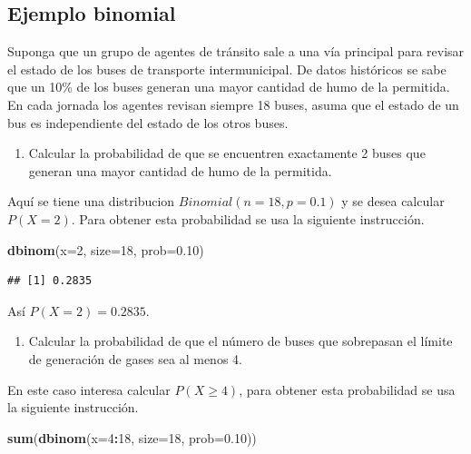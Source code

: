\documentclass[10pt,]{krantz}
\makeatletter
\newenvironment{Shaded}{\begin{snugshade}}{\end{snugshade}}
\newcommand{\KeywordTok}[1]{\textcolor[rgb]{0.13,0.29,0.53}{\textbf{#1}}}
\newcommand{\DataTypeTok}[1]{\textcolor[rgb]{0.13,0.29,0.53}{#1}}
\newcommand{\DecValTok}[1]{\textcolor[rgb]{0.00,0.00,0.81}{#1}}
\newcommand{\FloatTok}[1]{\textcolor[rgb]{0.00,0.00,0.81}{#1}}
\newcommand{\OperatorTok}[1]{\textcolor[rgb]{0.81,0.36,0.00}{\textbf{#1}}}
\newcommand{\NormalTok}[1]{#1}
\providecommand{\tightlist}{%
  \setlength{\itemsep}{0pt}\setlength{\parskip}{0pt}}
\newenvironment{kframe}{%
\medskip{}
\setlength{\fboxsep}{.8em}
 \def\at@end@of@kframe{}%
 \ifinner\ifhmode%
  \def\at@end@of@kframe{\end{minipage}}%
  \begin{minipage}{\columnwidth}%
 \fi\fi%
 \def\FrameCommand##1{\hskip\@totalleftmargin \hskip-\fboxsep
 \colorbox{shadecolor}{##1}\hskip-\fboxsep
     \hskip-\linewidth \hskip-\@totalleftmargin \hskip\columnwidth}%
 \MakeFramed {\advance\hsize-\width
   \@totalleftmargin\z@ \linewidth\hsize
   \@setminipage}}%
 {\par\unskip\endMakeFramed%
 \at@end@of@kframe}
\renewenvironment{Shaded}{\begin{kframe}}{\end{kframe}}
\makeatother
\begin{document}
\subsection*{Ejemplo binomial}\label{ejemplo-binomial}


Suponga que un grupo de agentes de tránsito sale a una vía principal
para revisar el estado de los buses de transporte intermunicipal. De
datos históricos se sabe que un 10\% de los buses generan una mayor
cantidad de humo de la permitida. En cada jornada los agentes revisan
siempre 18 buses, asuma que el estado de un bus es independiente del
estado de los otros buses.

\begin{enumerate}
\def\labelenumi{\arabic{enumi})}
\tightlist
\item
  Calcular la probabilidad de que se encuentren exactamente 2 buses que
  generan una mayor cantidad de humo de la permitida.
\end{enumerate}

Aquí se tiene una distribucion \(Binomial(n=18, p=0.1)\) y se desea
calcular \(P(X=2)\). Para obtener esta probabilidad se usa la siguiente
instrucción.

\begin{Shaded}
\begin{Highlighting}[]
\KeywordTok{dbinom}\NormalTok{(}\DataTypeTok{x=}\DecValTok{2}\NormalTok{, }\DataTypeTok{size=}\DecValTok{18}\NormalTok{, }\DataTypeTok{prob=}\FloatTok{0.10}\NormalTok{)}
\end{Highlighting}
\end{Shaded}

\begin{verbatim}
## [1] 0.2835
\end{verbatim}

Así \(P(X=2)=0.2835\).

\begin{enumerate}
\def\labelenumi{\arabic{enumi})}
\setcounter{enumi}{1}
\tightlist
\item
  Calcular la probabilidad de que el número de buses que sobrepasan el
  límite de generación de gases sea al menos 4.
\end{enumerate}

En este caso interesa calcular \(P(X \geq 4)\), para obtener esta
probabilidad se usa la siguiente instrucción.

\begin{Shaded}
\begin{Highlighting}[]
\KeywordTok{sum}\NormalTok{(}\KeywordTok{dbinom}\NormalTok{(}\DataTypeTok{x=}\DecValTok{4}\OperatorTok{:}\DecValTok{18}\NormalTok{, }\DataTypeTok{size=}\DecValTok{18}\NormalTok{, }\DataTypeTok{prob=}\FloatTok{0.10}\NormalTok{))}
\end{Highlighting}
\end{Shaded}
\end{document}
